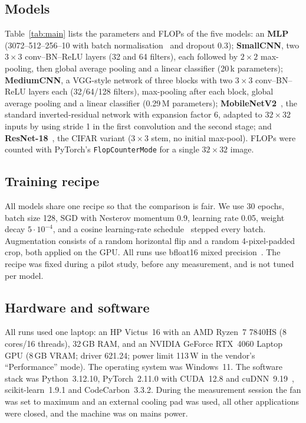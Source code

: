 \documentclass[conference]{IEEEtran}
\begin{document}
\subsection{Models}
Table~\ref{tab:main} lists the parameters and FLOPs of the five models: an \textbf{MLP} (3072--512--256--10 with batch normalisation~\cite{ioffe2015batchnorm} and dropout 0.3); \textbf{SmallCNN}, two $3\times3$ conv--BN--ReLU layers (32 and 64 filters), each followed by $2\times2$ max-pooling, then global average pooling and a linear classifier (20\,k parameters); \textbf{MediumCNN}, a VGG-style network of three blocks with two $3\times3$ conv--BN--ReLU layers each (32/64/128 filters), max-pooling after each block, global average pooling and a linear classifier (0.29\,M parameters); \textbf{MobileNetV2}~\cite{sandler2018mobilenetv2}, the standard inverted-residual network with expansion factor 6, adapted to $32\times32$ inputs by using stride 1 in the first convolution and the second stage; and \textbf{ResNet-18}~\cite{he2016resnet}, the CIFAR variant ($3\times3$ stem, no initial max-pool). FLOPs were counted with PyTorch's \texttt{FlopCounterMode} for a single $32\times32$ image.

\subsection{Training recipe}
All models share one recipe so that the comparison is fair. We use 30 epochs, batch size 128, SGD with Nesterov momentum 0.9, learning rate 0.05, weight decay $5\cdot10^{-4}$, and a cosine learning-rate schedule~\cite{loshchilov2017sgdr} stepped every batch. Augmentation consists of a random horizontal flip and a random 4-pixel-padded crop, both applied on the GPU. All runs use bfloat16 mixed precision~\cite{micikevicius2018mixed}. The recipe was fixed during a pilot study, before any measurement, and is not tuned per model.

\subsection{Hardware and software}
All runs used one laptop: an HP Victus~16 with an AMD Ryzen~7 7840HS (8 cores/16 threads), 32\,GB RAM, and an NVIDIA GeForce RTX~4060 Laptop GPU (8\,GB VRAM; driver 621.24; power limit 113\,W in the vendor's ``Performance'' mode). The operating system was Windows~11. The software stack was Python~3.12.10, PyTorch~2.11.0 with CUDA~12.8 and cuDNN~9.19~\cite{paszke2019pytorch}, scikit-learn~1.9.1 and CodeCarbon~3.3.2. During the measurement session the fan was set to maximum and an external cooling pad was used, all other applications were closed, and the machine was on mains power.
\end{document}

